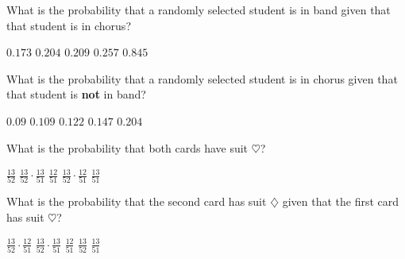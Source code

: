 \documentclass[answers,12pt]{exam}
\begin{document}
\begin{questions}

\question\label{FirstAmes} What is the probability that a randomly selected
student is in band given that that student is in chorus?\\
\begin{oneparchoices}
\correctchoice $0.173$ 
\choice $0.204$ %
\choice $0.209$ %
\choice $0.257$ %
\choice $0.845$ %
\end{oneparchoices}

\question\label{LastAmes} What is the probability that a randomly selected
student is in chorus given that that student is {\bf not} in band?\\
\begin{oneparchoices}
\choice $0.09$ %
\correctchoice $0.109$
\choice $0.122$ %
\choice $0.147$ %
\choice $0.204$ %
\end{oneparchoices}


\question\label{FirstCard} What is the probability that
both cards have suit $\heartsuit$?\\
\begin{oneparchoices}
\choice $\frac{13}{52}$
\choice $\frac{13}{52}\cdot\frac{13}{51}$
\choice $\frac{12}{51}$
\correctchoice $\frac{13}{52}\cdot\frac{12}{51}$
\choice $\frac{13}{51}$
\end{oneparchoices}

\question\label{LastCard} What is the probability that
the second card has suit $\diamondsuit$ given that the
first card has suit $\heartsuit$?\\
\begin{oneparchoices}
\choice $\frac{13}{52}\cdot\frac{12}{51}$
\choice $\frac{13}{52}\cdot\frac{13}{51}$
\choice $\frac{12}{51}$
\choice $\frac{13}{52}$
\correctchoice $\frac{13}{51}$
\end{oneparchoices}

\end{questions}
\end{document}
